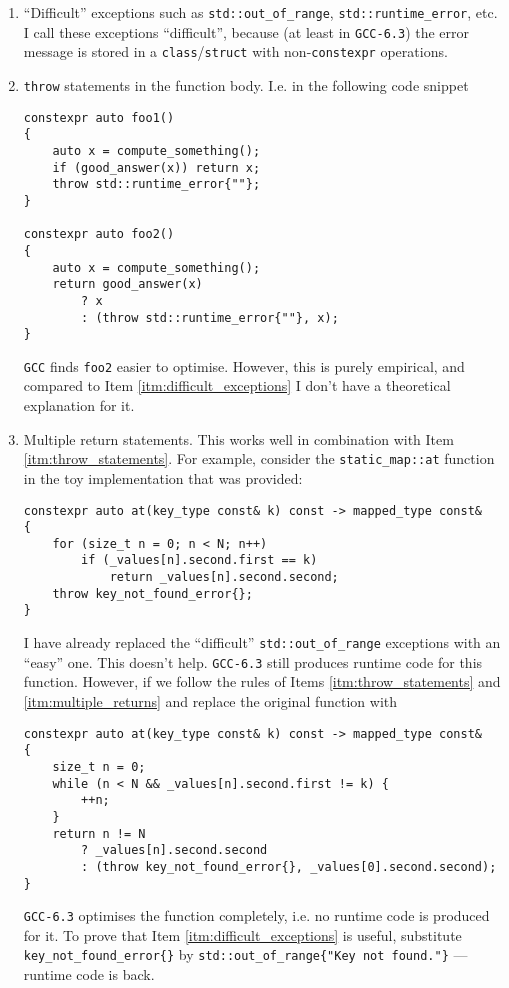\documentclass[a4paper,12pt]{article}
\begin{document}
    \begin{enumerate}
    \item \label{itm:difficult_exceptions} ``Difficult'' exceptions such as \texttt{std::out\_of\_range}, \texttt{std::runtime\_error}, etc. I call these exceptions ``difficult'', because (at least in \texttt{GCC-6.3}) the error message is stored in a \texttt{class}/\texttt{struct} with non-\texttt{constexpr} operations.
    \item \label{itm:throw_statements} \texttt{throw} statements in the function body. I.e. in the following code snippet
        \begin{spacing}{0.8}
\begin{lstlisting}
constexpr auto foo1()
{
    auto x = compute_something();
    if (good_answer(x)) return x;
    throw std::runtime_error{""};
}

constexpr auto foo2()
{
    auto x = compute_something();
    return good_answer(x)
        ? x
        : (throw std::runtime_error{""}, x);
}
\end{lstlisting}
        \end{spacing}
        \texttt{GCC} finds \texttt{foo2} easier to optimise. However, this is purely empirical, and compared to Item \ref{itm:difficult_exceptions} I don't have a theoretical explanation for it.

    \item \label{itm:multiple_returns} Multiple return statements. This works well in combination with Item \ref{itm:throw_statements}. For example, consider the \texttt{static\_map::at} function in the toy implementation that was provided:
        \begin{spacing}{0.8}
\begin{lstlisting}
constexpr auto at(key_type const& k) const -> mapped_type const&
{
    for (size_t n = 0; n < N; n++)
        if (_values[n].second.first == k)
            return _values[n].second.second;
    throw key_not_found_error{};
}
\end{lstlisting}
        \end{spacing}
        I have already replaced the ``difficult'' \texttt{std::out\_of\_range} exceptions with an ``easy'' one. This doesn't help. \texttt{GCC-6.3} still produces runtime code for this function. However, if we follow the rules of Items \ref{itm:throw_statements} and \ref{itm:multiple_returns} and replace the original function with
        \begin{spacing}{0.8}
\begin{lstlisting}
constexpr auto at(key_type const& k) const -> mapped_type const&
{
    size_t n = 0;
    while (n < N && _values[n].second.first != k) {
        ++n;
    }
    return n != N
        ? _values[n].second.second
        : (throw key_not_found_error{}, _values[0].second.second);
}
\end{lstlisting}
        \end{spacing}
        \texttt{GCC-6.3} optimises the function completely, i.e. no runtime code is produced for it. To prove that Item \ref{itm:difficult_exceptions} is useful, substitute \texttt{key\_not\_found\_error\{\}} by \texttt{std::out\_of\_range\{"Key not found."\}} --- runtime code is back.
    \end{enumerate}
    
\end{document}

